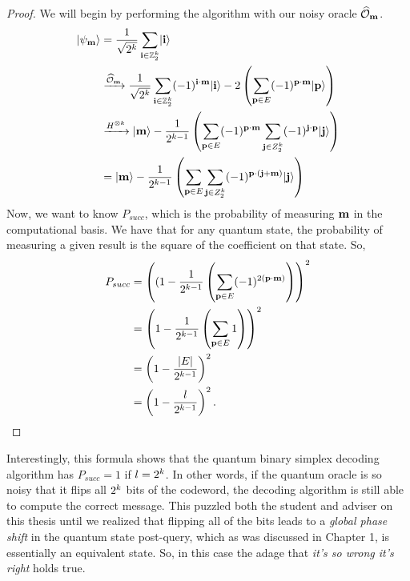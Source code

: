 \documentclass[12pt,twoside]{reedthesis}
\theoremstyle{definition}
\newlength{\arrow}
\newcommand{\Z}{\mathbb{Z}}
\newcommand{\ket}[1]{\ensuremath{\lvert #1\rangle}\xspace}
\begin{document}
\begin{proof}
We will begin by performing the algorithm with our noisy oracle $\widehat{\mathcal{O}}_\mathbf{m}$.
\begin{align*}
\ket{\psi_\mess} 
& = \frac{1}{\sqrt{2^\mlen}} \sum_{\mathbf{i} \in \Z_2^\mlen} \ket{\mathbf{i}} \\
& \xrightarrow{\widehat{\mathcal{O}}_\mess} \frac{1}{\sqrt{2^\mlen}} \sum_{\mathbf{i} \in \Z_2^\mlen} (-1)^{\mathbf{i} \cdot \mess}\ket{\mathbf{i}} -2\left( \sum_{\mathbf{p} \in E} (-1)^{\mathbf{p} \cdot \mess} \ket{\mathbf{p}}\right) \\
& \xrightarrow{H^{\otimes \mlen}} \ket{\mess} - \frac{1}{2^{\mlen -1}} \left( \sum_{\mathbf{p} \in E}(-1)^{\mathbf{p} \cdot \mess} \sum_{\mathbf{j} \in Z_2^\mlen} (-1)^{\mathbf{j} \cdot \mathbf{p}} \ket{\mathbf{j}}\right)\\
& = \ket{\mess} - \frac{1}{2^{\mlen-1}} \left( \sum_{\mathbf{p} \in E}\sum_{\mathbf{j} \in Z_2^\mlen} (-1)^{\mathbf{p} \cdot(\mathbf{j}+\mess)} \ket{\mathbf{j}} \right)
\end{align*}
Now, we want to know $P_{succ}$, which is the probability of measuring $\mathbf{m}$ in the computational basis. We have that for any quantum state, the probability of measuring a given result is the square of the coefficient on that state. So,
\begin{align*}
P_{succ} 
& = \left((1 - \frac{1}{2^{k-1}} \left( \sum_{\mathbf{p} \in E} (-1)^{2(\mathbf{p} \cdot \mathbf{m})} \right)\right)^2 \\
& = \left(1 - \frac{1}{2^{k-1}} \left( \sum_{\mathbf{p} \in E} 1 \right) \right)^2 \\
& = \left( 1 - \frac{\lvert E \rvert}{2^{k-1}}\right)^2\\
& = \left( 1 - \frac{l}{2^{k-1}}\right)^2.
\end{align*}
\end{proof}
Interestingly, this formula shows that the quantum binary simplex decoding algorithm has $P_{succ} = 1$ if $l = 2^k$. In other words, if the quantum oracle is so noisy that it flips all $2^k$ bits of the codeword, the decoding algorithm is still able to compute the correct message. This puzzled both the student and adviser on this thesis until we realized that flipping all of the bits leads to a \textit{global phase shift} in the quantum state post-query, which as was discussed in Chapter 1, is essentially an equivalent state. So, in this case the adage that \textit{it's so wrong it's right} holds true.
\end{document}
